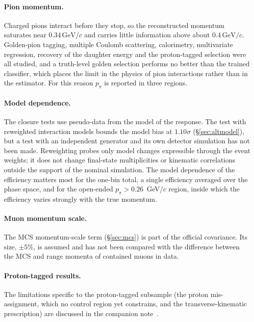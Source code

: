 \documentclass[11pt,a4paper]{article}
\newcommand{\GeVc}{\,\text{GeV}\!/c}
\begin{document}
\paragraph{Pion momentum.}
Charged pions interact before they stop, so the reconstructed momentum saturates near $0.34\GeVc$
and carries little information above about $0.4\GeVc$. Golden-pion tagging, multiple Coulomb
scattering, calorimetry, multivariate regression, recovery of the daughter energy and the
proton-tagged selection were all studied, and a truth-level golden selection performs no better than
the trained classifier, which places the limit in the physics of pion interactions rather than in
the estimator. For this reason $p_\pi$ is reported in three regions.

\paragraph{Model dependence.}
The closure tests use pseudo-data from the model of the response. The test with reweighted
interaction models bounds the model bias at $1.10\sigma$ (\S\ref{sec:altmodel}), but a test with an
independent generator and its own detector simulation has not been made. Reweighting probes only
model changes expressible through the event weights; it does not change final-state multiplicities or
kinematic correlations outside the support of the nominal simulation. The model dependence of
the efficiency matters most for the one-bin total, a single efficiency averaged over the phase space,
and for the open-ended $p_\pi>0.26$~GeV/$c$ region, inside which the efficiency varies strongly with
the true momentum.

\paragraph{Muon momentum scale.}
The MCS momentum-scale term (\S\ref{sec:mcs}) is part of the official covariance. Its size, $\pm5\%$,
is assumed and has not been compared with the difference between the MCS and range momenta of
contained muons in data.

\paragraph{Proton-tagged results.} The limitations specific to the proton-tagged subsample (the
proton mis-assignment, which no control region yet constrains, and the transverse-kinematic
prescription) are discussed in the companion note~\cite{pt_note}.
\end{document}
